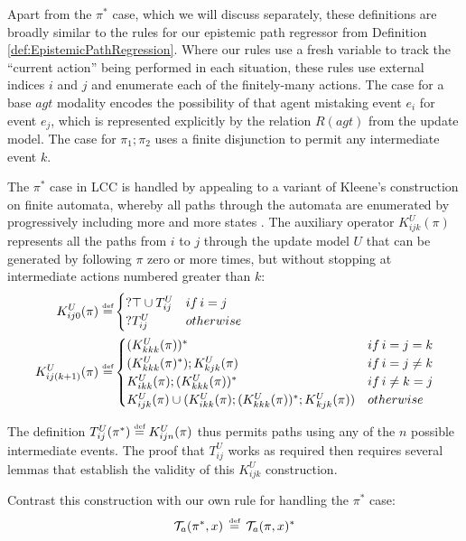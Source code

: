 Apart from the $\pi^{*}$ case, which we will discuss separately,
these definitions are broadly similar to the rules for our epistemic
path regressor from Definition \ref{def:EpistemicPathRegression}.
Where our rules use a fresh variable to track the {}``current action''
being performed in each situation, these rules use external indices
$i$ and $j$ and enumerate each of the finitely-many actions. The
case for a base $agt$ modality encodes the possibility of that agent
mistaking event $e_{i}$ for event $e_{j}$, which is represented
explicitly by the relation $R(agt)$ from the update model. The case
for $\pi_{1};\pi_{2}$ uses a finite disjunction to permit any intermediate
event $k$.

The $\pi^{*}$ case in LCC is handled by appealing to a variant of
Kleene's construction on finite automata, whereby all paths through
the automata are enumerated by progressively including more and more
states \citep[ Theorem 2.5.1]{lewis81theory_of_computation}. The
auxiliary operator $K_{ijk}^{U}(\pi)$ represents all the paths from
$i$ to $j$ through the update model $U$ that can be generated by
following $\pi$ zero or more times, but without stopping at intermediate
actions numbered greater than $k$:\begin{align*}
K_{ij0}^{U}(\pi)\stackrel{\mbox{\tiny def}}{=} & \begin{cases}
?\top\cup T_{ij}^{U} & if\, i=j\\
?T_{ij}^{U} & otherwise\end{cases}\\
K_{ij(k+1)}^{U}(\pi)\stackrel{\mbox{\tiny def}}{=} & \begin{cases}
(K_{kkk}^{U}(\pi))^{*} & if\, i=j=k\\
(K_{kkk}^{U}(\pi)^{*});K_{kjk}^{U}(\pi) & if\, i=j\neq k\\
K_{ikk}^{U}(\pi);(K_{kkk}^{U}(\pi))^{*} & if\, i\neq k=j\\
K_{ijk}^{U}(\pi)\cup(K_{ikk}^{U}(\pi);(K_{kkk}^{U}(\pi))^{*};K{}_{kjk}^{U}(\pi)) & otherwise\end{cases}\end{align*}


The definition $T_{ij}^{U}(\pi^{*})\stackrel{\mbox{\tiny def}}{=} K_{ijn}^{U}(\pi)$ thus
permits paths using any of the $n$ possible intermediate events.
The proof that $T_{ij}^{U}$ works as required then requires several
lemmas that establish the validity of this $K_{ijk}^{U}$ construction.

Contrast this construction with our own rule for handling the $\pi^{*}$
case:\[
\mathcal{T}_{a}(\pi^{*},x)\,\stackrel{\mbox{\tiny def}}{=}\,\mathcal{T}_{a}(\pi,x)^{*}\]


